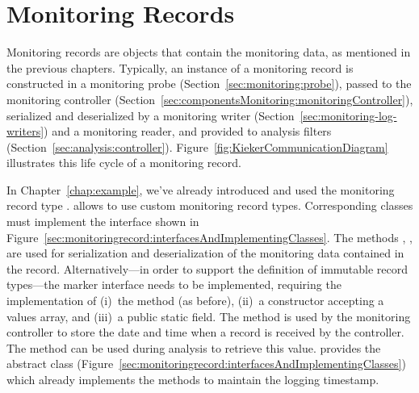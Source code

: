 \section{Monitoring Records}\label{sec:componentsMonitoring:monitoringRecords}

Monitoring records are objects that contain the monitoring data, as mentioned %
in the previous chapters. Typically, an instance of a monitoring record is %
constructed in a monitoring probe (Section~\ref{sec:monitoring:probe}), %
passed to the monitoring controller (Section~\ref{sec:componentsMonitoring:monitoringController}), %
serialized and deserialized by a monitoring %
writer (Section~\ref{sec:monitoring-log-writers}) and a
monitoring reader, and provided to analysis filters (Section~\ref{sec:analysis:controller}). %
Figure~\ref{fig:KiekerCommunicationDiagram} illustrates this life cycle of a monitoring %
record. %

In Chapter~\ref{chap:example}, we've already introduced and used the monitoring %
record type . \Kieker{} allows to use custom %
monitoring record types. Corresponding classes must implement the %
interface  shown in Figure~\ref{sec:monitoringrecord:interfacesAndImplementingClasses}. %
The methods , ,  %
are used for serialization and deserialization of the monitoring data contained %
in the record. Alternatively---in order to support the definition of immutable record types---the %
marker interface  needs to be implemented, requiring the %
implementation of (i)~the  method (as before), (ii)~a %
constructor accepting a values array, and (iii)~a public static  %
field. The method  is used by the monitoring controller to %
store the date and time when a record is received by the controller. %
The method  can be used during analysis to retrieve %
this value. \KiekerMonitoringPart{} provides the abstract class %
 (Figure~\ref{sec:monitoringrecord:interfacesAndImplementingClasses}) %
which already implements the methods to maintain the logging timestamp.

